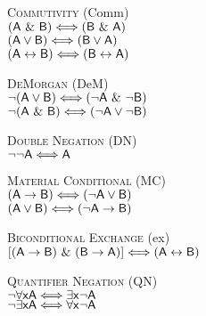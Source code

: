 {
\center

\textsc{Commutivity} (Comm)\\
$(\mathsf{A}~\&~\mathsf{B}) \Longleftrightarrow (\mathsf{B}~\&~\mathsf{A})$\\
$(\mathsf{A}\vee\mathsf{B}) \Longleftrightarrow (\mathsf{B}\vee\mathsf{A})$\\
$(\mathsf{A}\leftrightarrow\mathsf{B}) \Longleftrightarrow (\mathsf{B}\leftrightarrow\mathsf{A})$
\bigskip

\textsc{DeMorgan} (DeM)\\
${\neg}(\mathsf{A}\vee\mathsf{B}) \Longleftrightarrow ({\neg}\mathsf{A}~\&~{\neg}\mathsf{B})$\\
${\neg}(\mathsf{A}~\&~\mathsf{B}) \Longleftrightarrow ({\neg}\mathsf{A}\vee{\neg}\mathsf{B})$
\bigskip

\textsc{Double Negation} (DN)\\
${\neg}{\neg}\mathsf{A} \Longleftrightarrow \mathsf{A}$
\bigskip

\textsc{Material Conditional} (MC)\\
$(\mathsf{A}\rightarrow\mathsf{B}) \Longleftrightarrow ({\neg}\mathsf{A}\vee\mathsf{B})$\\
$(\mathsf{A}\vee\mathsf{B}) \Longleftrightarrow ({\neg}\mathsf{A}\rightarrow\mathsf{B})$
\bigskip

\textsc{Biconditional Exchange} ({\eiff}{ex})\\
$[(\mathsf{A}\rightarrow\mathsf{B})~\&~(\mathsf{B}\rightarrow\mathsf{A})] \Longleftrightarrow (\mathsf{A}\leftrightarrow\mathsf{B})$
\bigskip

\textsc{Quantifier Negation} (QN)\\
${\neg}\forall\mathsf{x}\mathsf{A} \Longleftrightarrow \exists\mathsf{x}{\neg}\mathsf{A}$\\
${\neg}\exists\mathsf{x}\mathsf{A} \Longleftrightarrow \forall\mathsf{x}{\neg}\mathsf{A}$

}



